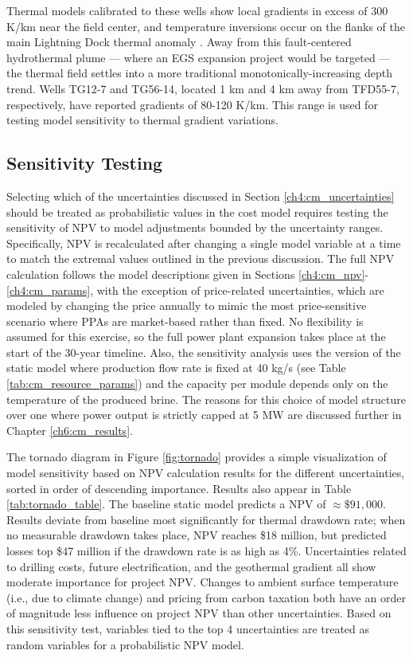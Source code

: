Thermal models calibrated to these wells show local gradients in excess of 300 K/km near the field center, and temperature inversions occur on the flanks of the main Lightning Dock thermal anomaly \citep[see Figs.\ 23-24]{cunniff_final_2005}. Away from this fault-centered hydrothermal plume --- where an EGS expansion project would be targeted --- the thermal field settles into a more traditional monotonically-increasing depth trend. Wells TG12-7 and TG56-14, located 1 km and 4 km away from TFD55-7, respectively, have reported gradients of 80-120 K/km. This range is used for testing model sensitivity to thermal gradient variations.

\subsection{Sensitivity Testing}\label{ch4:sensitivity}
Selecting which of the uncertainties discussed in Section \ref{ch4:cm_uncertainties} should be treated as probabilistic values in the cost model requires testing the sensitivity of NPV to model adjustments bounded by the uncertainty ranges. Specifically, NPV is recalculated after changing a single model variable at a time to match the extremal values outlined in the previous discussion. The full NPV calculation follows the model descriptions given in Sections \ref{ch4:cm_npv}-\ref{ch4:cm_params}, with the exception of price-related uncertainties, which are modeled by changing the price annually to mimic the most price-sensitive scenario where PPAs are market-based rather than fixed. No flexibility is assumed for this exercise, so the full power plant expansion takes place at the start of the 30-year timeline. Also, the sensitivity analysis uses the version of the static model where production flow rate is fixed at 40 kg/s (see Table \ref{tab:cm_resource_params}) and the capacity per module depends only on the temperature of the produced brine. The reasons for this choice of model structure over one where power output is strictly capped at 5 MW are discussed further in Chapter \ref{ch6:cm_results}.

The tornado diagram in Figure \ref{fig:tornado} provides a simple visualization of model sensitivity based on NPV calculation results for the different uncertainties, sorted in order of descending importance. Results also appear in Table \ref{tab:tornado_table}. The baseline static model predicts a NPV of $\approx \$91,000$. Results deviate from baseline most significantly for thermal drawdown rate; when no measurable drawdown takes place, NPV reaches \$18 million, but predicted losses top \$47 million if the drawdown rate is as high as 4\%. Uncertainties related to drilling costs, future electrification, and the geothermal gradient all show moderate importance for project NPV. Changes to ambient surface temperature (i.e., due to climate change) and pricing from carbon taxation both have an order of magnitude less influence on project NPV than other uncertainties. Based on this sensitivity test, variables tied to the top 4 uncertainties are treated as random variables for a probabilistic NPV model.

